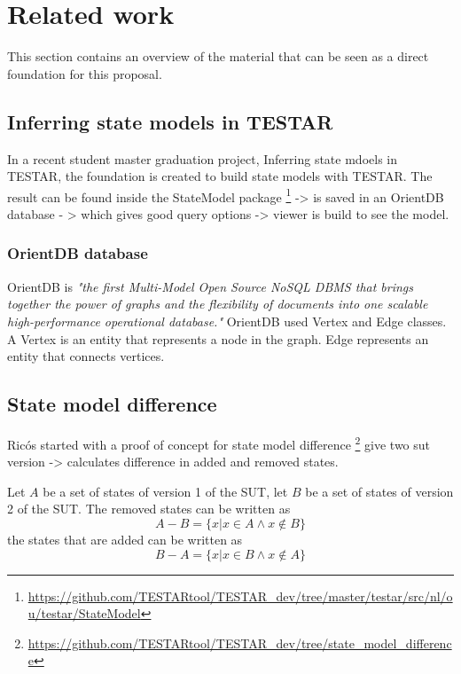 \section{Related work} \label{releatedWork}

This section contains an overview of the material that can be seen as a direct foundation for this proposal.

\subsection{Inferring state models in TESTAR}

In a recent student master graduation project, Inferring state mdoels in TESTAR, \cite{thesisMulders}  the foundation is created to build state models with TESTAR. The result can be found inside the StateModel package \footnote{\url{https://github.com/TESTARtool/TESTAR_dev/tree/master/testar/src/nl/ou/testar/StateModel}}
-> is saved in an OrientDB database - > which gives good query options -> viewer is build to see the model. 
\subsubsection{OrientDB database}

OrientDB is \textit{"the first Multi-Model Open Source NoSQL DBMS that brings together the power of graphs and the flexibility of documents into one scalable high-performance operational database."} \cite{orientdb1} 
OrientDB used Vertex and Edge classes. A Vertex is an entity that represents a node in the graph. Edge represents an entity that connects vertices. 


\subsection{State model difference}
Ricós started with a proof of concept for state model difference \footnote{\url{https://github.com/TESTARtool/TESTAR\_dev/tree/state_model_difference}}
give two sut version -> calculates difference in added and removed states.

Let $A$ be a set of states of version 1 of the SUT, let $B$ be a set of states of version 2 of the SUT. The removed states can be written as
\[A-B = \lbrace x | x \in A \wedge x \notin B \rbrace\]
the states that are added can be written as
\[B-A = \lbrace x | x \in B \wedge x \notin A \rbrace\]


